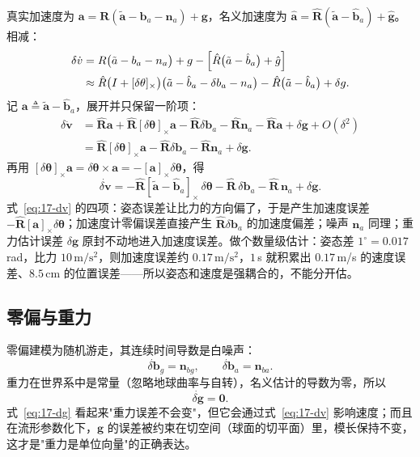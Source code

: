真实加速度为 $\bm{a}=\bm{R}(\tilde{\bm{a}}-\bm{b}_a-\bm{n}_a)+\bm{g}$，名义加速度为 $\hat{\bm{a}}=\hat{\bm{R}}(\tilde{\bm{a}}-\hat{\bm{b}}_a)+\hat{\bm{g}}$。相减：
\begin{align}
  \delta\dot{v}&=R\bigl(\tilde{a}-b_a-n_a\bigr)+g-\Bigl[\hat{R}\bigl(\tilde{a}-\hat{b}_a\bigr)+\hat{g}\Bigr]\nonumber\\
  &\approx\hat{R}\bigl(I+[\delta\theta]_\times\bigr)\bigl(\tilde{a}-\hat{b}_a-\delta b_a-n_a\bigr)-\hat{R}\bigl(\tilde{a}-\hat{b}_a\bigr)+\delta g.
\end{align}
记 $\bm{a}\triangleq\tilde{\bm{a}}-\hat{\bm{b}}_a$，展开并只保留一阶项：
\begin{align}
  \delta\dot{\bm{v}}&=\hat{\bm{R}}\bm{a}+\hat{\bm{R}}[\delta\bm{\theta}]_\times\bm{a}-\hat{\bm{R}}\delta\bm{b}_a-\hat{\bm{R}}\bm{n}_a-\hat{\bm{R}}\bm{a}+\delta\bm{g}+O(\delta^2)\nonumber\\
  &=\hat{\bm{R}}[\delta\bm{\theta}]_\times\bm{a}-\hat{\bm{R}}\delta\bm{b}_a-\hat{\bm{R}}\bm{n}_a+\delta\bm{g}.
\end{align}
再用 $[\delta\bm{\theta}]_\times\bm{a}=\delta\bm{\theta}\times\bm{a}=-[\bm{a}]_\times\delta\bm{\theta}$，得
\begin{equation}\label{eq:17-dv}
  \dot{\delta\bm{v}}=-\hat{\bm{R}}[\tilde{\bm{a}}-\hat{\bm{b}}_a]_\times\,\delta\bm{\theta}-\hat{\bm{R}}\,\delta\bm{b}_a-\hat{\bm{R}}\,\bm{n}_a+\delta\bm{g}.
\end{equation}
式~\eqref{eq:17-dv} 的四项：姿态误差让比力的方向偏了，于是产生加速度误差 $-\hat{\bm{R}}[\bm{a}]_\times\delta\bm{\theta}$；加速度计零偏误差直接产生 $\hat{\bm{R}}\delta\bm{b}_a$ 的加速度偏差；噪声 $\bm{n}_a$ 同理；重力估计误差 $\delta\bm{g}$ 原封不动地进入加速度误差。做个数量级估计：姿态差 $1^{\circ}=0.017$\,rad，比力 $10\,\mathrm{m/s^2}$，则加速度误差约 $0.17\,\mathrm{m/s^2}$，$1$\,s 就积累出 $0.17$\,m/s 的速度误差、$8.5$\,cm 的位置误差——所以姿态和速度是强耦合的，不能分开估。

\subsection{零偏与重力}

零偏建模为随机游走，其连续时间导数是白噪声：
\begin{equation}\label{eq:17-dbias}
  \dot{\delta\bm{b}}_g=\bm{n}_{bg},\qquad \dot{\delta\bm{b}}_a=\bm{n}_{ba}.
\end{equation}
重力在世界系中是常量（忽略地球曲率与自转），名义估计的导数为零，所以
\begin{equation}\label{eq:17-dg}
  \dot{\delta\bm{g}}=\bm{0}.
\end{equation}
式~\eqref{eq:17-dg} 看起来"重力误差不会变"，但它会通过式~\eqref{eq:17-dv} 影响速度；而且在流形参数化下，$\bm{g}$ 的误差被约束在切空间（球面的切平面）里，模长保持不变，这才是"重力是单位向量"的正确表达。

